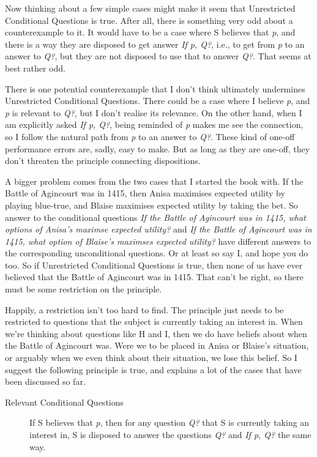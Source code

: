 \documentclass[
  12pt,
  letterpaper,
]{scrbook}
\begin{document}
Now thinking about a few simple cases might make it seem that
Unrestricted Conditional Questions is true. After all, there is
something very odd about a counterexample to it. It would have to be a
case where S believes that \emph{p}, and there is a way they are
disposed to get answer \emph{If p, Q?}, i.e., to get from \emph{p} to an
answer to \emph{Q?}, but they are not disposed to use that to answer
\emph{Q?}. That seems at best rather odd.

There is one potential counterexample that I don't think ultimately
undermines Unrestricted Conditional Questions. There could be a case
where I believe \emph{p}, and \emph{p} is relevant to \emph{Q?}, but I
don't realise its relevance. On the other hand, when I am explicitly
asked \emph{If p, Q?}, being reminded of \emph{p} makes me see the
connection, so I follow the natural path from \emph{p} to an answer to
\emph{Q?}. These kind of one-off performance errors are, sadly, easy to
make. But as long as they are one-off, they don't threaten the principle
connecting dispositions.

A bigger problem comes from the two cases that I started the book with.
If the Battle of Agincourt was in 1415, then Anisa maximises expected
utility by playing blue-true, and Blaise maximises expected utility by
taking the bet. So answer to the conditional questions \emph{If the
Battle of Agincourt was in 1415, what options of Anisa's maximse
expected utility?} and \emph{If the Battle of Agincourt was in 1415,
what option of Blaise's maximses expected utility?} have different
answers to the corresponding unconditional questions. Or at least so say
I, and hope you do too. So if Unrestricted Conditional Questions is
true, then none of us have ever believed that the Battle of Agincourt
was in 1415. That can't be right, so there must be some restriction on
the principle.

Happily, a restriction isn't too hard to find. The principle just needs
to be restricted to questions that the subject is currently taking an
interest in. When we're thinking about questions like H and I, then we
do have beliefs about when the Battle of Agincourt was. Were we to be
placed in Anisa or Blaise's situation, or arguably when we even think
about their situation, we lose this belief. So I suggest the following
principle is true, and explains a lot of the cases that have been
discussed so far.

\begin{description}
\item[Relevant Conditional Questions]
If S believes that \emph{p}, then for any question \emph{Q?} that S is
currently taking an interest in, S is disposed to answer the questions
\emph{Q?} and \emph{If p, Q?} the same way.
\end{description}
\end{document}
